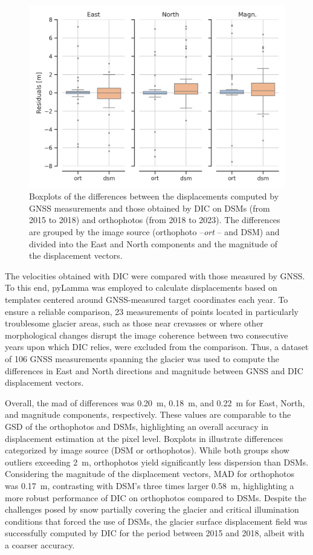 \begin{figure}[ht!]
    \centering
    \includegraphics[width=0.8\columnwidth]{gps_lamma_boxplot.png}
    \caption{Boxplots of the differences between the displacements computed by GNSS measurements and those obtained by DIC on DSMs (from 2015 to 2018) and orthophotos (from 2018 to 2023). The differences are grouped by the image source (orthophoto --\textit{ort} -- and DSM) and divided into the East and North components and the magnitude of the displacement vectors.}
    \label{fig:3:gps_lamma_boxplot}
\end{figure}

The velocities obtained with DIC were compared with those measured by GNSS.
To this end, pyLamma was employed to calculate displacements based on templates centered around GNSS-measured target coordinates each year. 
To ensure a reliable comparison, 23 measurements of points located in particularly troublesome glacier areas, such as those near crevasses or where other morphological changes disrupt the image coherence between two consecutive years upon which DIC relies, were excluded from the comparison.
Thus, a dataset of 106 GNSS measurements spanning the glacier was used to compute the differences in East and North directions and magnitude between GNSS and DIC displacement vectors.

Overall, the \ac{mad} of differences was \SI{0.20}{\meter}, \SI{0.18}{\meter}, and \SI{0.22}{\meter} for East, North, and magnitude components, respectively.
These values are comparable to the GSD of the orthophotos and DSMs, highlighting an overall accuracy in displacement estimation at the pixel level.
Boxplots in  illustrate differences categorized by image source (DSM or orthophotos). 
While both groups show outliers exceeding \SI{2}{\meter}, orthophotos yield significantly less dispersion than DSMs.
Considering the magnitude of the displacement vectors, MAD for orthophotos was \SI{0.17}{\meter}, contrasting with DSM's three times larger \SI{0.58}{\meter}, highlighting a more robust performance of DIC on orthophotos compared to DSMs. 
Despite the challenges posed by snow partially covering the glacier and critical illumination conditions that forced the use of DSMs, the glacier surface displacement field was successfully computed by DIC for the period between 2015 and 2018, albeit with a coarser accuracy.


